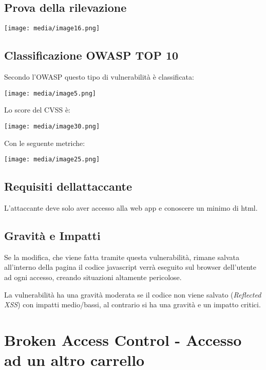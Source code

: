 \subsection{Prova della rilevazione}\label{prova-della-rilevazione-1}

\texttt{[image: media/image16.png]}

\subsection{Classificazione OWASP TOP
10}\label{classificazione-owasp-top-10-1}

Secondo l'OWASP questo tipo di vulnerabilità è classificata:

\texttt{[image: media/image5.png]}

Lo score del CVSS è:

\texttt{[image: media/image30.png]}

Con le seguente metriche:

\texttt{[image: media/image25.png]}

\subsection{Requisiti
dell\textquotesingle attaccante}\label{requisiti-dellattaccante-1}

L'attaccante deve solo aver accesso alla web app e conoscere un minimo
di html.

\subsection{Gravità e Impatti}\label{gravituxe0-e-impatti-1}

Se la modifica, che viene fatta tramite questa vulnerabilità, rimane
salvata all'interno della pagina il codice javascript verrà eseguito sul
browser dell'utente ad ogni accesso, creando situazioni altamente
pericolose.

La vulnerabilità ha una gravità moderata se il codice non viene salvato
(\emph{Reflected XSS}) con impatti medio/bassi, al contrario si ha una
gravità e un impatto critici.

\section{Broken Access Control - Accesso ad un altro
carrello}\label{broken-access-control---accesso-ad-un-altro-carrello}

